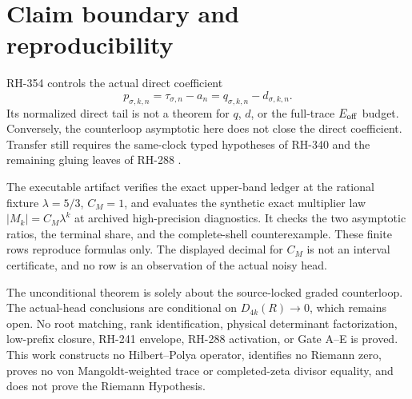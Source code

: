 \documentclass[11pt]{article}
\theoremstyle{remark}
\begin{document}
\section{Claim boundary and reproducibility}

RH-354 controls the actual direct coefficient
\begin{equation}\label{eq:p-distinction}
 p_{\sigma,k,n}=\tau_{\sigma,n}-a_n
 =q_{\sigma,k,n}-d_{\sigma,k,n}.
\end{equation}
Its normalized direct tail is not a theorem for $q$, $d$, or the full-trace
$E_{\rm off}$ budget.  Conversely, the counterloop asymptotic here does not
close the direct coefficient.  Transfer still requires the same-clock typed
hypotheses of RH-340 and the remaining gluing leaves of RH-288
\citep{WangDirectTail2026,WangSynchronization2026,WangGluing2026}.

The executable artifact verifies the exact upper-band ledger at the rational
fixture $\lambda=5/3$, $C_M=1$, and evaluates the synthetic exact multiplier
law $|M_k|=C_M\lambda^k$ at archived high-precision diagnostics.  It checks
the two asymptotic ratios, the terminal share, and the complete-shell
counterexample.  These finite rows reproduce formulas only.  The displayed
decimal for $C_M$ is not an interval certificate, and no row is an
observation of the actual noisy head.

The unconditional theorem is solely about the source-locked graded
counterloop.  The actual-head conclusions are conditional on
$D_{4k}(R)\to0$, which remains open.  No root matching, rank identification,
physical determinant factorization, low-prefix closure, RH-241 envelope,
RH-288 activation, or Gate A--E is proved.  This work constructs no
Hilbert--Polya operator, identifies no Riemann zero, proves no von
Mangoldt-weighted trace or completed-zeta divisor equality, and does not
prove the Riemann Hypothesis.



\end{document}
